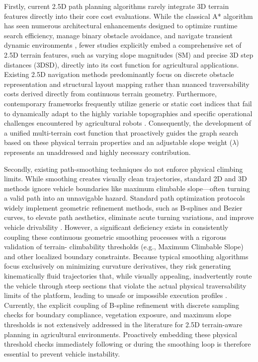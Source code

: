 Firstly, current 2.5D path planning algorithms rarely integrate 3D terrain
features directly into their core cost evaluations. While the classical A*
algorithm has seen numerous architectural enhancements designed to optimize
runtime search efficiency, manage binary obstacle avoidance, and navigate
transient dynamic environments \citep{Injarapu_2023_surveyautonomous,
Lei_2021_globalpath, Li_2020_pathplanning}, fewer studies explicitly embed a
comprehensive set of 2.5D terrain features, such as varying slope magnitudes
(SM) and precise 3D step distances (3DSD), directly into its cost function for
agricultural applications. Existing 2.5D navigation methods predominantly focus
on discrete obstacle representation and structural layout mapping rather than
nuanced traversability costs derived directly from continuous terrain geometry.
Furthermore, contemporary frameworks frequently utilize generic or static cost
indices that fail to dynamically adapt to the highly variable topographies and
specific operational challenges encountered by agricultural robots
\citep{Bettencourt_2025_indoor25d}. Consequently, the development of a unified
multi-terrain cost function that proactively guides the graph search based on
these physical terrain properties and an adjustable slope weight ($\lambda$)
represents an unaddressed and highly necessary contribution.

Secondly, existing path-smoothing techniques do not enforce physical climbing
limits. While smoothing creates visually clean trajectories, standard 2D and 3D
methods ignore vehicle boundaries like maximum climbable slope—often turning a
valid path into an unnavigable hazard. Standard path optimization protocols
widely implement geometric refinement methods, such as B-splines and Bezier
curves, to elevate path aesthetics, eliminate acute turning variations, and
improve vehicle drivability \citep{Han_2019_agvpath, Zhang_2021_mobilerobot,
Frey_2022_selfsupervisedneartofar}. However, a significant deficiency exists in
consistently coupling these continuous geometric smoothing processes with a
rigorous validation of terrain- climbability thresholds (e.g., Maximum Climbable
Slope) and other localized boundary constraints. Because typical smoothing
algorithms focus exclusively on minimizing curvature derivatives, they risk
generating kinematically fluid trajectories that, while visually appealing,
inadvertently route the vehicle through steep sections that violate the actual
physical traversability limits of the platform, leading to unsafe or impossible
execution profiles \citep{Frey_2022_selfsupervisedneartofar}. Currently, the
explicit coupling of B-spline refinement with discrete sampling checks for
boundary compliance, vegetation exposure, and maximum slope thresholds is not
extensively addressed in the literature for 2.5D terrain-aware planning in
agricultural environments. Proactively embedding these physical threshold checks
immediately following or during the smoothing loop is therefore essential to
prevent vehicle instability.

